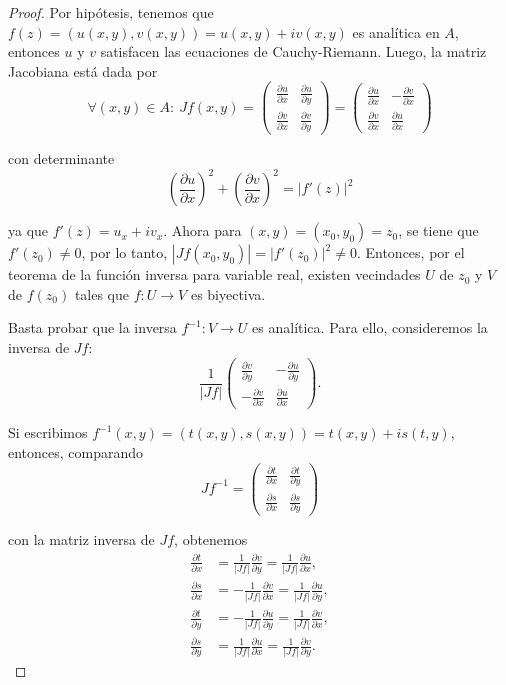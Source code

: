 \begin{proof}
Por hipótesis, tenemos que $f(z) = (u(x,y), v(x,y)) = u(x,y) + iv(x,y)$ es analítica en $A$, entonces $u$ y $v$ satisfacen las ecuaciones de Cauchy-Riemann. Luego, la matriz Jacobiana está dada por
$$\forall (x,y) \in A: ~ Jf(x,y) = \begin{pmatrix}
\frac{\partial u}{\partial x} & \frac{\partial u}{\partial y} \\
\frac{\partial v}{\partial x} & \frac{\partial v}{\partial y}
\end{pmatrix}  = \begin{pmatrix}
\frac{\partial u}{\partial x} & -\frac{\partial v}{\partial x} \\
\frac{\partial v}{\partial x} & \frac{\partial u}{\partial x}
\end{pmatrix}$$

con determinante
$$\left(\frac{\partial u}{\partial x} \right)^2 + \left(\frac{\partial v}{\partial x} \right)^2 = |f'(z)|^2$$

ya que $f'(z) = u_x + i v_x $.  Ahora para $(x,y) = (x_0,y_0) = z_0$, se tiene que $f'(z_0) \neq 0$, por lo tanto, $|Jf(x_0,y_0)| = |f'(z_0)|^2 \neq 0$. Entonces, por el teorema de la función inversa para variable real, existen vecindades $U$ de $z_0$ y $V$ de $f(z_0)$ tales que $f: U \longrightarrow V$ es biyectiva. 

Basta probar que la inversa $f^{-1}: V \longrightarrow U$ es analítica. Para ello, consideremos la inversa de $Jf$:
$$\frac{1}{|Jf|} \begin{pmatrix} \frac{\partial v}{\partial y} & - \frac{\partial u}{\partial y} \\
-\frac{\partial v}{\partial x} & \frac{\partial u}{\partial x}
\end{pmatrix}.$$

Si escribimos $f^{-1}(x,y) = (t(x,y) , s(x,y)) =  t(x,y) + i s(t,y)$, entonces, comparando
$$J f^{-1} = \begin{pmatrix} \frac{\partial t}{\partial x} &  \frac{\partial t}{\partial y} \\
\frac{\partial s}{\partial x} & \frac{\partial s}{\partial y}
\end{pmatrix}$$

con la matriz inversa de $Jf$, obtenemos
\begin{align*}
    \frac{\partial t}{\partial x} &= \frac{1}{|Jf|} \frac{\partial v}{\partial y} = \frac{1}{|Jf|} \frac{\partial u}{\partial x}, \\
    \frac{\partial s}{\partial x} &= -\frac{1}{|Jf|} \frac{\partial v}{\partial x} = \frac{1}{|Jf|} \frac{\partial u}{\partial y}, \\
     \frac{\partial t}{\partial y} &= -\frac{1}{|Jf|} \frac{\partial u}{\partial y} = \frac{1}{|Jf|} \frac{\partial v}{\partial x}, \\
      \frac{\partial s}{\partial y} &= \frac{1}{|Jf|} \frac{\partial u}{\partial x} = \frac{1}{|Jf|} \frac{\partial v}{\partial y}.
\end{align*}


\end{proof}
